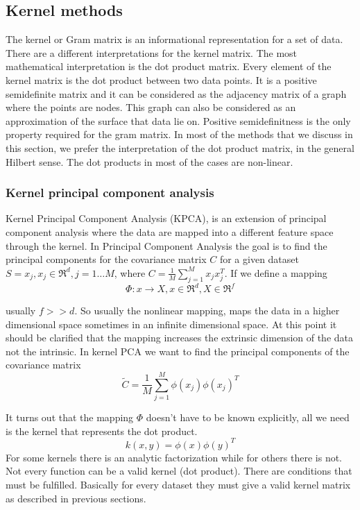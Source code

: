 \documentclass[12pt,letterpaper,doublespaced,ETD,dvips,proposal]{gtthesis}
\begin{document}
\begin{Body}
\subsection{Kernel methods}
\label{Kernel_methods}

 The kernel or Gram matrix is an informational representation
for a set of data. There are a different interpretations for the
kernel matrix. The most mathematical interpretation is the dot
product matrix. Every element of the kernel matrix is the dot
product between two data points. It is a positive semidefinite
matrix and it can be considered as the adjacency matrix of a graph
where the points are nodes. This graph can also be considered as an
approximation of the surface that data lie on. Positive
semidefinitness is the only property required for the gram matrix.
In most of the methods that we discuss in this section, we prefer
the interpretation of the dot product matrix, in the general Hilbert
sense. The dot products in most of the cases are non-linear.

\subsubsection{Kernel principal component analysis}
\label{Kernel_principal_component_analysis}

Kernel Principal Component Analysis (KPCA), is an extension of
principal component analysis where the data are mapped into a
different feature space through the kernel. In Principal Component
Analysis the goal is to find the principal components for  the
covariance matrix $C$ for a given dataset $S={x_j, x_j\in \Re^d, j=1
\dots M}$, where $C=\frac{1}{M}\sum_{j=1}^{M}x_j x_j^T$. If we
define a mapping
\begin{equation}
\Phi : x \rightarrow X , x \in \Re^d, X\in \Re^f
\end{equation}

usually $f>>d$. So usually the nonlinear mapping, maps the data in a
higher dimensional space sometimes in an infinite dimensional space.
At this point it should be clarified that the mapping increases the
extrinsic dimension of the data not the intrinsic. In kernel PCA we
want to find the principal components of the covariance matrix
\begin{equation}
\tilde{C} = \frac{1}{M}\sum_{j=1}^{M}\phi(x_j)\phi(x_j)^T
\end{equation}

It turns out that the mapping $\Phi$ doesn't have to be known
explicitly, all we need is the kernel that represents the dot
product.
\begin{equation}
k(x, y) = \phi(x)\phi(y)^T
\end{equation}
For some kernels there is an analytic factorization while for others
there is not. Not every function can be a valid kernel (dot
product). There are conditions that must be fulfilled. Basically for
every dataset they  must give a valid kernel matrix as described in
previous sections.


\end{Body}
\end{document}
